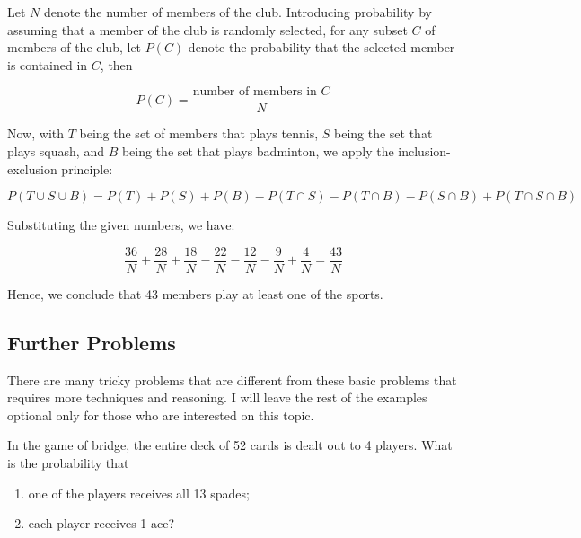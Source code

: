                 \begin{solution}
                Let \(N\) denote the number of members of the club. Introducing probability by assuming that a member of the club is randomly selected, for any subset \(C\) of members of the club, let \(P(C)\) denote the probability that the selected member is contained in \(C\), then
                
                \[
                P(C) = \frac{\text{number of members in } C}{N}
                \]
                
                Now, with \(T\) being the set of members that plays tennis, \(S\) being the set that plays squash, and \(B\) being the set that plays badminton, we apply the inclusion-exclusion principle:
                
                \[
                P(T \cup S \cup B) = P(T) + P(S) + P(B) - P(T \cap S) - P(T \cap B) - P(S \cap B) + P(T \cap S \cap B)
                \]
                
                Substituting the given numbers, we have:
                
                \[
                \frac{36}{N} + \frac{28}{N} + \frac{18}{N} - \frac{22}{N} - \frac{12}{N} - \frac{9}{N} + \frac{4}{N} = \frac{43}{N}
                \]
                
                Hence, we conclude that 43 members play at least one of the sports.
                \end{solution}

        \subsection{Further Problems}
        There are many tricky problems that are different from these basic problems that requires
        more techniques and reasoning. I will leave the rest of the examples optional only for those
        who are interested on this topic.

        \begin{example}
            In the game of bridge, the entire deck of 52 cards is dealt out to 4 players. What is the probability that
            \begin{enumerate}[label = \alph*)]
                \item one of the players receives all 13 spades;
                \item each player receives 1 ace?
            \end{enumerate}
        \end{example}
            
